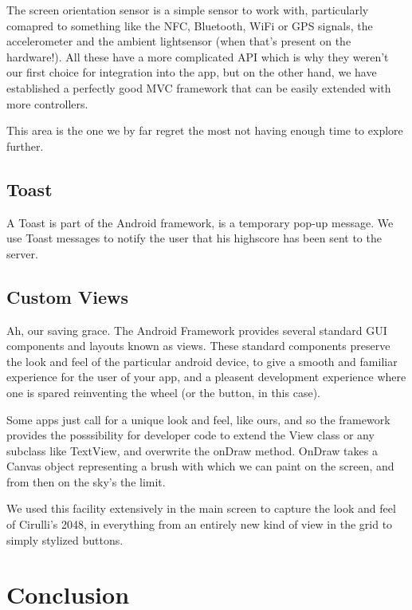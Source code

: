 \documentclass[a4paper, 12pt]{article}
\begin{document}
The screen orientation sensor is a simple sensor to work with,
particularly comapred to something like the NFC, Bluetooth, WiFi or
GPS signals, the accelerometer and the ambient lightsensor (when
that's present on the hardware!). All these have a more complicated
API which is why they weren't our first choice for integration into
the app, but on the other hand, we have established a perfectly good
MVC framework that can be easily extended with more controllers.

This area is the one we by far regret the most not having enough time
to explore further.

\subsection{Toast}
A Toast is part of the Android framework, is a temporary pop-up
message. We use Toast messages to notify the user that his highscore
has been sent to the server.

\subsection{Custom Views}
Ah, our saving grace. The Android Framework provides several standard
GUI components and layouts known as views. These standard components
preserve the look and feel of the particular android device, to give a
smooth and familiar experience for the user of your app, and a
pleasent development experience where one is spared reinventing the
wheel (or the button, in this case).

Some apps just call for a unique look and feel, like ours, and so the
framework provides the posssibility for developer code to extend the
View class or any subclass like TextView, and overwrite the onDraw
method. OnDraw takes a Canvas object representing a brush with which
we can paint on the screen, and from then on the sky's the limit.

We used this facility extensively in the main screen to capture the
look and feel of Cirulli's 2048, in everything from an entirely new
kind of view in the grid to simply stylized buttons.


\section{Conclusion}
\end{document}
